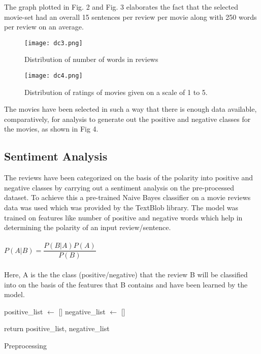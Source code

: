 \documentclass[conference]{IEEEtran}
\begin{document}
The graph plotted in Fig. 2  and Fig. 3 elaborates the fact that the selected movie-set had an overall 15 sentences per review per movie along with 250 words per review on an average.

\begin{figure}
  \texttt{[image: dc3.png]}
  \caption{Distribution of number of words in reviews}
  \label{fig:boat1}
\end{figure}

\begin{figure}
  \texttt{[image: dc4.png]}
  \caption{Distribution of ratings of movies given on a scale of 1 to 5.}
  \label{fig:boat1}
\end{figure}

The movies have been selected in such a way that there is enough data available, comparatively, for analysis to generate out the positive and negative classes for the movies, as shown in Fig 4.

\subsection{Sentiment Analysis}\label{AA}
The reviews have been categorized on the basis of the polarity into positive and negative classes by carrying out a sentiment analysis on the pre-processed dataset. To achieve this a pre-trained Naive Bayes classifier on a movie reviews data was used which was provided by the TextBlob library. The model was trained on features like number of positive and negative words which help in determining the polarity of an input review/sentence.
\\
\\
 \phantom{x}\hspace{9ex}$P\left( A|B\right) =\dfrac {P\left( B|A\right) P\left( A\right) }{P\left( B\right) } $  
\\
\\
Here, A is the the class (positive/negative) that the review B will be classified into on the basis of the features that B contains and have been learned by the model. \\

\begin{algorithm}[H]
 
 positive\_list $\leftarrow$ [] \;
 negative\_list $\leftarrow$ [] \;
 
return positive\_list, negative\_list \;
\caption{Preprocessing}
\end{algorithm}
\end{document}
